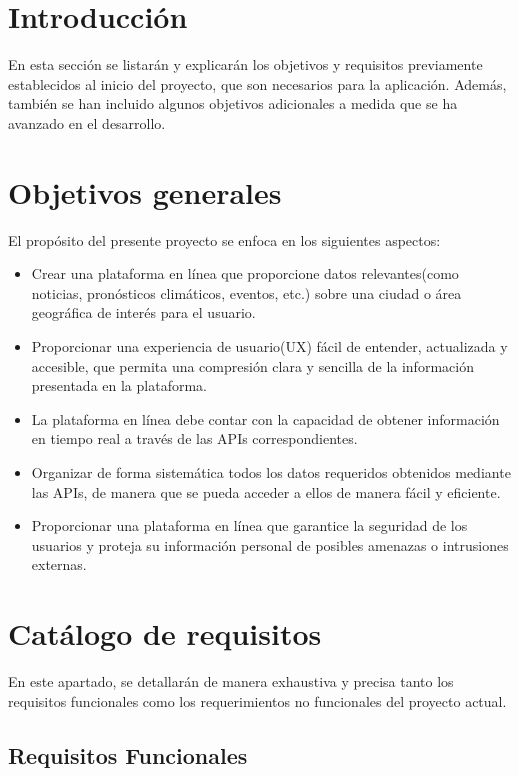 
\section{Introducción}

En esta sección se listarán y explicarán los objetivos y requisitos previamente establecidos al inicio del proyecto, que son necesarios para la aplicación. Además, también se han incluido algunos objetivos adicionales a medida que se ha avanzado en el desarrollo.

\section{Objetivos generales}
El propósito del presente proyecto se enfoca en los siguientes aspectos:

\begin{itemize}
    \item Crear una plataforma en línea que proporcione datos relevantes(como noticias, pronósticos climáticos, eventos, etc.) sobre una ciudad o área geográfica de interés para el usuario.
    \item Proporcionar una experiencia de usuario(UX) fácil de entender, actualizada y accesible, que permita una compresión clara y sencilla de la información presentada en la plataforma.
    \item La plataforma en línea debe contar con la capacidad de obtener información en tiempo real a través de las APIs correspondientes.
    \item Organizar de forma sistemática todos los datos requeridos obtenidos mediante las APIs, de manera que se pueda acceder a ellos de manera fácil y eficiente.
    \item Proporcionar una plataforma en línea que garantice la seguridad de los usuarios y proteja su información personal de posibles amenazas o intrusiones externas.
\end{itemize}

\section{Catálogo de requisitos}

En este apartado, se detallarán de manera exhaustiva y precisa tanto los requisitos funcionales como los requerimientos no funcionales del proyecto actual.

\subsection{Requisitos Funcionales}

